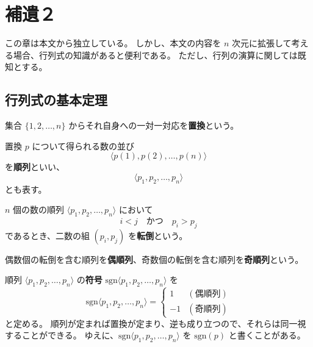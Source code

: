 \chapter{補遺２}

\setcounter{thm}{0}
\setcounter{dfn}{0}
\setcounter{col}{0}
\setcounter{lmm}{0}

この章は本文から独立している。
しかし、本文の内容を \(n\) 次元に拡張して考える場合、行列式の知識があると便利である。
ただし、行列の演算に関しては既知とする。

\section*{行列式の基本定理}

\begin{dfn}[置換]
  集合 \(\{1,2,\ldots,n\}\) からそれ自身への一対一対応を\textbf{置換}という。
\end{dfn}

\begin{dfn}[順列]
  置換 \(p\) について得られる数の並び
  \[\langle p(1),p(2),\ldots,p(n)\rangle\]
  を\textbf{順列}といい、
  \[\langle p_1,p_2,\ldots,p_n\rangle\]
  とも表す。
\end{dfn}

\begin{dfn}[転倒]
  \(n\) 個の数の順列 \(\langle p_1,p_2,\ldots,p_n\rangle\) において
  \[i<j \quad\text{かつ}\quad p_i>p_j\]
  であるとき、二数の組 \((p_i,p_j)\) を\textbf{転倒}という。
\end{dfn}

\begin{dfn}
  偶数個の転倒を含む順列を\textbf{偶順列}、奇数個の転倒を含む順列を\textbf{奇順列}という。
\end{dfn}

\begin{dfn}[符号]
  順列 \(\langle p_1,p_2,\ldots,p_n\rangle\) の\textbf{符号} \(\mathrm{sgn}\langle p_1,p_2,\ldots,p_n\rangle\) を
  \begin{equation*}
    \mathrm{sgn}\langle p_1,p_2,\ldots,p_n\rangle=
    \begin{cases}
      1  & (偶順列) \\
      -1 & (奇順列)
    \end{cases}
  \end{equation*}
  と定める。
  順列が定まれば置換が定まり、逆も成り立つので、それらは同一視することができる。
  ゆえに、\(\mathrm{sgn}\langle p_1,p_2,\ldots,p_n\rangle\) を \(\mathrm{sgn}(p)\) と書くことがある。
\end{dfn}

